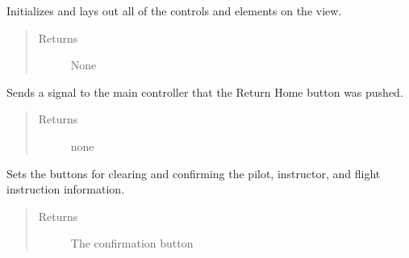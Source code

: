 \documentclass[letterpaper,10pt,english]{sphinxmanual}
\begin{document}
\begin{fulllineitems}
\begin{fulllineitems}
\begin{quote}
\begin{description}
\end{description}\end{quote}

\end{fulllineitems}


\begin{fulllineitems}
\label{\detokenize{index:src.Views.View_TrackingScreen.TrackingWindow.initView}}
Initializes and lays out all of the controls and elements on the view.
\begin{quote}\begin{description}
\item[{Returns}] \leavevmode
None

\end{description}\end{quote}

\end{fulllineitems}


\begin{fulllineitems}
\label{\detokenize{index:src.Views.View_TrackingScreen.TrackingWindow.returnHome}}
Sends a signal to the main controller that the Return Home button was pushed.
\begin{quote}\begin{description}
\item[{Returns}] \leavevmode
none

\end{description}\end{quote}

\end{fulllineitems}


\begin{fulllineitems}
\label{\detokenize{index:src.Views.View_TrackingScreen.TrackingWindow.setClrConfirmBtns}}
Sets the buttons for clearing and confirming the pilot, instructor, and flight instruction information.
\begin{quote}\begin{description}
\item[{Returns}] \leavevmode
The confirmation button


\end{description}
\end{quote}
\end{fulllineitems}
\end{fulllineitems}
\end{document}
